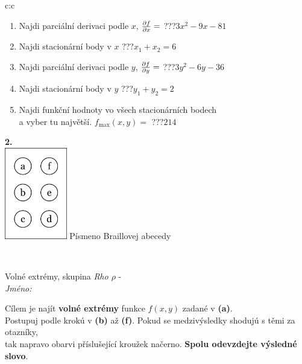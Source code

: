 \documentclass[10pt]{report}
\begin{document}
\begin{tabular}{c:c}
\begin{minipage}[c][104.5mm][t]{0.5\linewidth}
\begin{center}
\begin{minipage}{0.79\linewidth}
\begin{center}
\begin{varwidth}{\linewidth}
\begin{enumerate}
\item Najdi parciální derivaci podle $x$, $\pdv{f}{x}=$\quad \dotfill\; ???\;\dotfill \quad $3x^2-9x-81$
\item Najdi stacionární body v $x$\quad \dotfill\; ???\;\dotfill \quad $x_1+x_2=6$
\item Najdi parciální derivaci podle $y$, $\pdv{f}{y}=$\quad \dotfill\; ???\;\dotfill \quad $3y^2-6y-36$
\item Najdi stacionární body v $y$\quad \dotfill\; ???\;\dotfill \quad $y_1+y_2=2$
\item Najdi funkční hodnoty vo všech stacionárních bodech \\ \phantom{xxxxxx} a vyber tu najvětší. $f_{\text{max}}(x,y)=$\quad \dotfill\; ???\;\dotfill \quad $214$
\end{enumerate}
\end{varwidth}
\end{center}
\end{minipage}
\begin{minipage}{0.20\linewidth}
\begin{center}
{\Huge\bfseries 2.} \\[2mm]
\includegraphics[height=40mm]{../images/braille.png}
{\small Písmeno Braillovej abecedy}
\end{center}
\end{minipage}
\end{center}
\end{minipage}
\\ \hdashline
\begin{minipage}[c][104.5mm][t]{0.5\linewidth}
\begin{center}
\vspace{7mm}
{\huge Volné extrémy, skupina \textit{Rho $\rho$} -}\\[5mm]
\textit{Jméno:}\phantom{xxxxxxxxxxxxxxxxxxxxxxxxxxxxxxxxxxxxxxxxxxxxxxxxxxxxxxxxxxxxxxxxx}\\[5mm]
\begin{minipage}{0.95\linewidth}
\begin{center}
Cílem je najít \textbf{volné extrémy} funkce $f(x,y)$ zadané v \textbf{(a)}.\\Postupuj podle krokú v \textbf{(b)} až \textbf{(f)}. Pokud se medzivýsledky shodujú s těmi za otazníky,\\tak napravo obarvi příslušející kroužek načerno. \textbf{Spolu odevzdejte výsledné slovo}.

\end{center}
\end{minipage}
\end{center}
\end{minipage}
\end{tabular}
\end{document}

